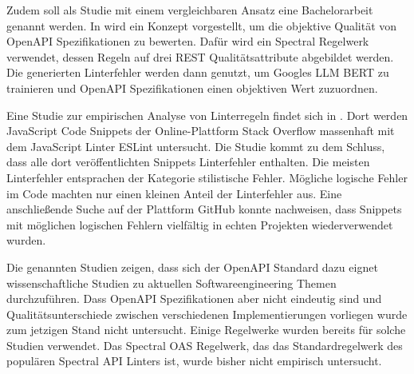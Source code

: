 Zudem soll als Studie mit einem vergleichbaren Ansatz eine Bachelorarbeit genannt werden. In \parencite{eriksson_using_2023} wird ein Konzept vorgestellt, um die objektive Qualität von OpenAPI Spezifikationen zu bewerten. Dafür wird ein Spectral Regelwerk verwendet, dessen Regeln auf drei REST Qualitätsattribute abgebildet werden. Die generierten Linterfehler werden dann genutzt, um Googles  \acs{LLM} BERT zu trainieren und OpenAPI Spezifikationen einen objektiven Wert zuzuordnen.

Eine Studie zur empirischen Analyse von Linterregeln findet sich in \parencite{ferreira_campos_mining_2019}. Dort werden JavaScript Code Snippets der Online-Plattform Stack Overflow massenhaft mit dem JavaScript Linter ESLint untersucht. Die Studie kommt zu dem Schluss, dass alle dort veröffentlichten Snippets Linterfehler enthalten. Die meisten Linterfehler entsprachen der Kategorie stilistische Fehler. Mögliche logische Fehler im Code machten nur einen kleinen Anteil der Linterfehler aus. Eine anschließende Suche auf der Plattform GitHub konnte nachweisen, dass Snippets mit möglichen logischen Fehlern vielfältig in echten Projekten wiederverwendet wurden. 

Die genannten Studien zeigen, dass sich der OpenAPI Standard dazu eignet wissenschaftliche Studien zu aktuellen Softwareengineering Themen durchzuführen. Dass OpenAPI Spezifikationen aber nicht eindeutig sind und Qualitätsunterschiede zwischen verschiedenen Implementierungen vorliegen wurde zum jetzigen Stand nicht untersucht. Einige Regelwerke wurden bereits für solche Studien verwendet. Das Spectral \acs{OAS} Regelwerk, das das Standardregelwerk des populären Spectral \acs{API} Linters ist, wurde bisher nicht empirisch untersucht.
